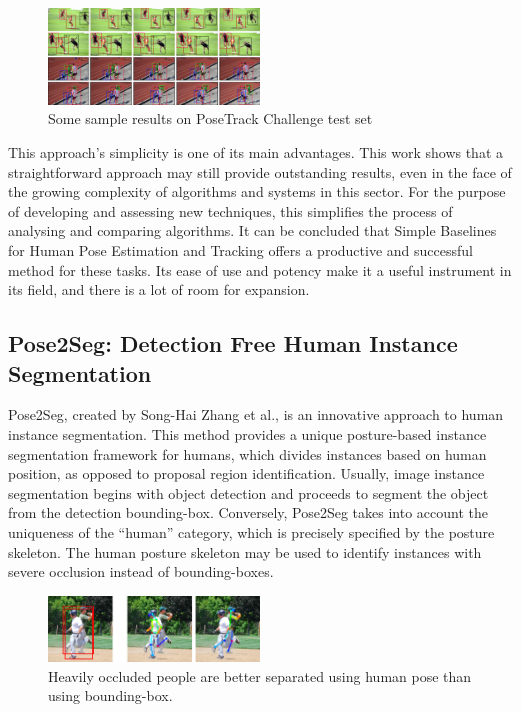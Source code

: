 \documentclass[runningheads]{llncs}
\begin{document}
        \begin{figure}[htbp]
            \centering
            \includegraphics[width=0.5\textwidth]{figures/sample.png}
            \caption{Some sample results on PoseTrack Challenge test set}
        \end{figure}

        This approach's simplicity is one of its main advantages. This work shows that a straightforward approach may still provide outstanding results, even in the face of the growing complexity of algorithms and systems in this sector. For the purpose of developing and assessing new techniques, this simplifies the process of analysing and comparing algorithms. It can be concluded that Simple Baselines for Human Pose Estimation and Tracking offers a productive and successful method for these tasks. Its ease of use and potency make it a useful instrument in its field, and there is a lot of room for expansion.

    \subsection{Pose2Seg: Detection Free Human Instance Segmentation \parencite{zhang2019pose2segdetectionfreehuman}}
        Pose2Seg, created by Song-Hai Zhang et al., is an innovative approach to human instance segmentation. This method provides a unique posture-based instance segmentation framework for humans, which divides instances based on human position, as opposed to proposal region identification. Usually, image instance segmentation begins with object detection and proceeds to segment the object from the detection bounding-box. Conversely, Pose2Seg takes into account the uniqueness of the ``human'' category, which is precisely specified by the posture skeleton. The human posture skeleton may be used to identify instances with severe occlusion instead of bounding-boxes.\\
        
        \begin{figure}[htbp]
            \centering
            \includegraphics[width=0.5\textwidth]{figures/Pose2Seg.png}
            \caption{Heavily occluded people are better separated using human pose than using bounding-box.}
        \end{figure}
\end{document}

